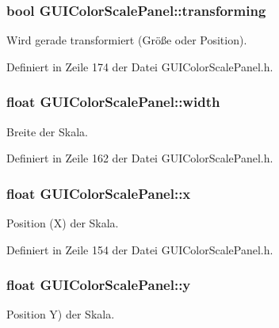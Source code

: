 \hypertarget{classGUIColorScalePanel_a3330450ed906fb99f56ed825d53f69e1}{
\subsubsection[{transforming}]{\setlength{\rightskip}{0pt plus 5cm}bool G\-U\-I\-Color\-Scale\-Panel\-::transforming\hspace{0.3cm}{\ttfamily [private]}}}\label{classGUIColorScalePanel_a3330450ed906fb99f56ed825d53f69e1}
Wird gerade transformiert (Größe oder Position). 

Definiert in Zeile 174 der Datei G\-U\-I\-Color\-Scale\-Panel.\-h.

\hypertarget{classGUIColorScalePanel_a1bc7bdf89d2447cddd08f5ae5f6638fa}{
\subsubsection[{width}]{\setlength{\rightskip}{0pt plus 5cm}float G\-U\-I\-Color\-Scale\-Panel\-::width\hspace{0.3cm}{\ttfamily [private]}}}\label{classGUIColorScalePanel_a1bc7bdf89d2447cddd08f5ae5f6638fa}
Breite der Skala. 

Definiert in Zeile 162 der Datei G\-U\-I\-Color\-Scale\-Panel.\-h.

\hypertarget{classGUIColorScalePanel_a41599e2046e6766d5276c95d4aa54ad3}{
\subsubsection[{x}]{\setlength{\rightskip}{0pt plus 5cm}float G\-U\-I\-Color\-Scale\-Panel\-::x\hspace{0.3cm}{\ttfamily [private]}}}\label{classGUIColorScalePanel_a41599e2046e6766d5276c95d4aa54ad3}
Position (X) der Skala. 

Definiert in Zeile 154 der Datei G\-U\-I\-Color\-Scale\-Panel.\-h.

\hypertarget{classGUIColorScalePanel_a5a33f7666c1c49ca8cfe2e4de3dd06e0}{
\subsubsection[{y}]{\setlength{\rightskip}{0pt plus 5cm}float G\-U\-I\-Color\-Scale\-Panel\-::y\hspace{0.3cm}{\ttfamily [private]}}}\label{classGUIColorScalePanel_a5a33f7666c1c49ca8cfe2e4de3dd06e0}
Position Y) der Skala. 

